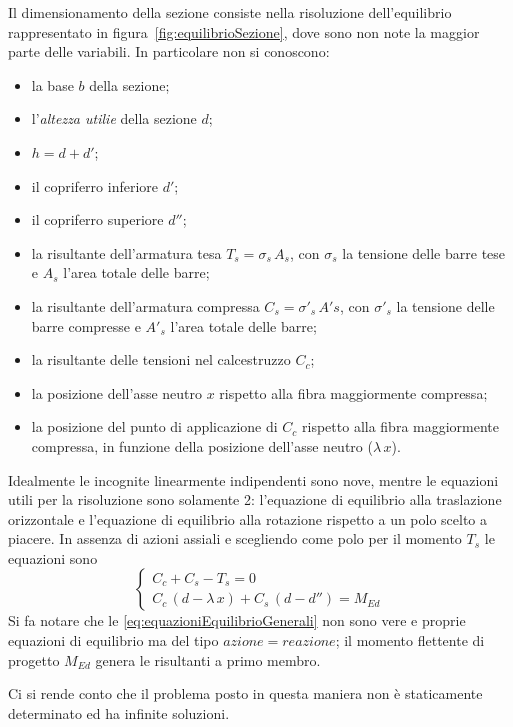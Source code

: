 Il dimensionamento della sezione consiste nella risoluzione dell'equilibrio rappresentato in figura~\ref{fig:equilibrioSezione}, dove sono non note la maggior parte delle variabili. In particolare non si conoscono:
\begin{itemize}
	\item la base $b$ della sezione;
	\item l'\textit{altezza utilie} della sezione $d$;
	\item $h = d + d'$;
	\item il copriferro inferiore $d'$;
	\item il copriferro superiore $d''$;
	\item la risultante dell'armatura tesa $T_s = \sigma_s\, A_s$, con $\sigma_s$ la tensione delle barre tese e $A_s$ l'area totale delle barre;
	\item la risultante dell'armatura compressa $C_s = \sigma'_s\,A's$, con $\sigma'_s$ la tensione delle barre compresse e $A'_s$ l'area totale delle barre;
	\item la risultante delle tensioni nel calcestruzzo $C_c$;
	\item la posizione dell'asse neutro $x$ rispetto alla fibra maggiormente compressa;
	\item la posizione del punto di applicazione di $C_c$ rispetto alla fibra maggiormente compressa, in funzione della posizione dell'asse neutro ($\lambda\,x$).
\end{itemize}

Idealmente le incognite linearmente indipendenti sono nove, mentre le equazioni utili per la risoluzione sono solamente 2: l'equazione di equilibrio alla traslazione orizzontale e l'equazione di equilibrio alla rotazione rispetto a un polo scelto a piacere. In assenza di azioni assiali e scegliendo come polo per il momento $T_s$ le equazioni sono
\begin{equation}
	\label{eq:equazioniEquilibrioGenerali}
	\begin{cases}
		C_c + C_s - T_s = 0\\
		C_c\,(d-\lambda\,x) + C_s\,(d-d'') = M_{Ed}
	\end{cases}
\end{equation}
Si fa notare che le \ref{eq:equazioniEquilibrioGenerali} non sono vere e proprie equazioni di equilibrio ma del tipo $azione = reazione$; il momento flettente di progetto $M_{Ed}$ genera le risultanti a primo membro.

Ci si rende conto che il problema posto in questa maniera non è staticamente determinato ed ha infinite soluzioni.

